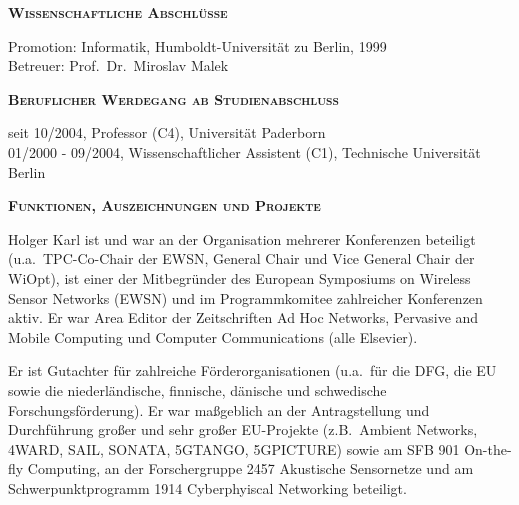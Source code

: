\vspace{0.9em}
\noindent\textsc{\textbf{Wissenschaftliche Abschlüsse}}

Promotion: Informatik, Humboldt-Universität zu Berlin, 1999 \\
Betreuer: Prof.\ Dr.\ Miroslav Malek

\vspace{0.9em}
\noindent\textsc{\textbf{Beruflicher Werdegang ab Studienabschluss}}

seit 10/2004, Professor (C4), Universität Paderborn \\
01/2000 - 09/2004, Wissenschaftlicher Assistent (C1), Technische Universität Berlin 

\vspace{0.9em}
\noindent\textsc{\textbf{Funktionen, Auszeichnungen und Projekte}}

Holger Karl ist und war an der Organisation mehrerer Konferenzen beteiligt (u.a.\ TPC-Co-Chair der EWSN, General Chair und Vice General Chair der WiOpt), ist einer der Mitbegründer des European Symposiums on Wireless Sensor Networks (EWSN) und im Programmkomitee zahlreicher Konferenzen aktiv. Er war Area Editor der Zeitschriften Ad Hoc Networks, Pervasive and Mobile Computing und Computer Communications (alle Elsevier).
  
Er ist Gutachter für zahlreiche Förderorganisationen (u.a.\ für die DFG, die EU sowie die niederländische, finnische, dänische und schwedische Forschungsförderung). Er war maßgeblich an der Antragstellung und Durchführung großer und sehr großer EU-Projekte (z.B.\ Ambient Networks, 4WARD, SAIL, SONATA, 5GTANGO, 5GPICTURE) sowie am SFB 901 On-the-fly Computing, an der Forschergruppe 2457 Akustische Sensornetze und am Schwerpunktprogramm 1914  Cyberphyiscal Networking beteiligt.



\nocite{valentin2007implementing}
